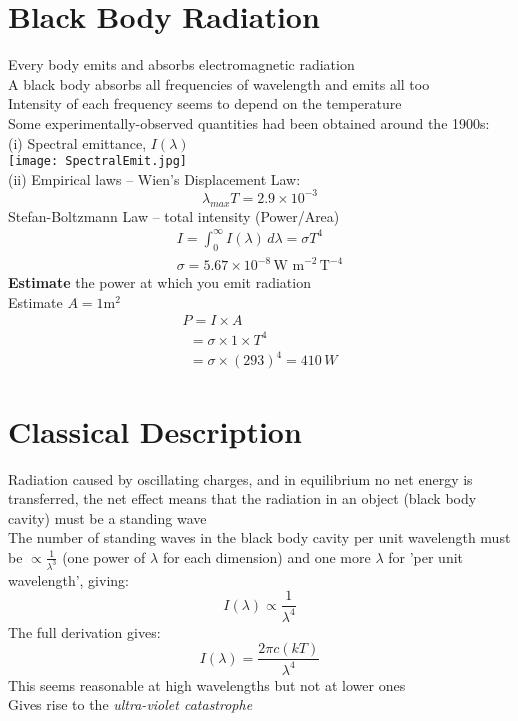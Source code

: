 \documentclass[a4paper, 11pt, fleqn, normalem]{report}
\begin{document}
\section{Black Body Radiation}
Every body emits and absorbs electromagnetic radiation \\
A black body absorbs all frequencies of wavelength and emits all too \\
Intensity of each frequency seems to depend on the temperature \\
Some experimentally-observed quantities had been obtained around the 1900s: \\
(i) Spectral emittance, $I(\lambda)$ \\
\texttt{[image: SpectralEmit.jpg]} \\
(ii) Empirical laws -- Wien's Displacement Law:
\begin{equation*}
    \lambda_{max}T = 2.9\times10^{-3}
\end{equation*}
Stefan-Boltzmann Law -- total intensity (Power/Area)
\begin{gather*}
    I = \int_{0}^{\infty} I(\lambda)\,d\lambda = \sigma T^{4} \\
    \sigma = 5.67\times10^{-8}\,\text{W m}^{-2}\,\text{T}^{-4}
\end{gather*}
\textbf{Estimate} the power at which you emit radiation \\
Estimate $A = 1$m$^{2}$
\begin{gather*}
    P = I \times A \\
    ~~ = \sigma \times 1 \times T^{4} \\
    ~~ = \sigma \times (293)^{4} = 410\,W
\end{gather*}

\section{Classical Description}
Radiation caused by oscillating charges, and in equilibrium no net energy is transferred, the net effect means that the radiation in an object (black body cavity) must be a standing wave \\
The number of standing waves in the black body cavity per unit wavelength must be $\propto \frac{1}{\lambda^{3}}$ (one power of $\lambda$ for each dimension) and one more $\lambda$ for 'per unit wavelength', giving:
\begin{equation*}
    I(\lambda) \propto \frac{1}{\lambda^{4}}
\end{equation*}
The full derivation gives:
\begin{equation*}
    I(\lambda) = \frac{2\pi c(kT)}{\lambda^{4}}
\end{equation*}
This seems reasonable at high wavelengths but not at lower ones \\
Gives rise to the \emph{ultra-violet catastrophe}
\end{document}
